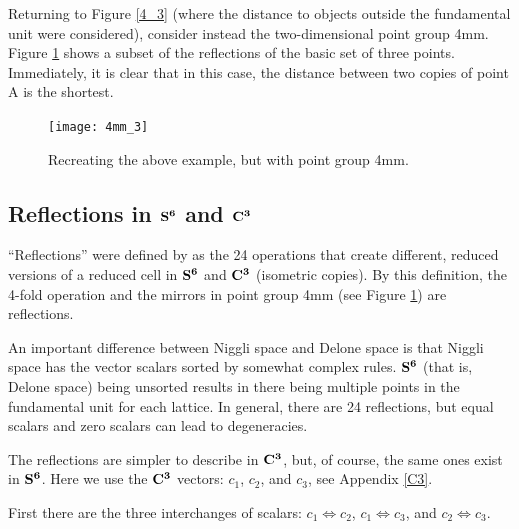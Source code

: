 \documentclass[preprint]{iucr}              %
\numberwithin{equation}{section}
\newcommand{\SVI}[0]{$\bf{S^{6}}$}
\newcommand{\CIII}[0]{$\bf{C^{3}}$}
\begin{document}
	Returning to Figure \ref{4_3} (where the distance to objects
	outside the fundamental unit were considered), consider instead the
	 two-dimensional point group 4mm. Figure
	\ref{4mm_3} shows a subset of the reflections of the basic set of three points.
	Immediately, it is clear that in this case, the 
	distance between two copies of
	point A is the shortest.
	
\begin{centering}
\begin{figure}
	\texttt{[image: 4mm\_3]}
	\label{4mm_3}
	\caption{Recreating the above example, but with point group 4mm. }
\end{figure}
\end{centering}

\subsection{Reflections in \SVI{} and \CIII{}}

``Reflections'' were defined by as
the 24 operations that create different, reduced versions of
a reduced cell in \SVI{} and \CIII{} (isometric copies).
By this definition, the 
4-fold operation and the mirrors in point group 4mm (see Figure \ref{4mm_3})
are reflections.

	An important difference between Niggli space and Delone space
	is that Niggli space has the vector scalars sorted by 
	somewhat complex rules. \SVI{} (that is, Delone space)
	being unsorted results in there being multiple points in the
	fundamental unit for each lattice. In general, there are 24 
	reflections, but equal scalars and zero scalars can lead to degeneracies.
	
	The reflections are simpler to describe in \CIII{}, but,
	of course, the same ones exist in \SVI{}. Here we use the \CIII{} vectors: $c_1$, $c_2$, and $c_3$, see Appendix \ref{C3}.
	
First there are the three interchanges of scalars: $c_1\Longleftrightarrow c_2$, $c_1\Longleftrightarrow c_3$, 
and $c_2\Longleftrightarrow c_3$.
\end{document}
